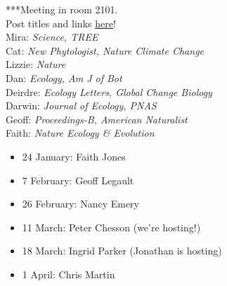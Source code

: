 \documentclass[11pt]{article}
\newenvironment{smitemize}{
\begin{itemize}
  \setlength{\itemsep}{0pt}
  \setlength{\parskip}{0.8pt}
  \setlength{\parsep}{0pt}}
{\end{itemize}
}
\begin{document}
***Meeting in room 2101.
\vspace{7pt}\\
 Post titles and links \href{https://docs.google.com/document/d/1j0WdDbjdp8ERLSO7whvtnP-tOblYMlX33TSCXy_uRKo/edit?usp=sharing}{\underline{here}}!\\
Mira: \emph{Science, TREE} \\
Cat: \emph{New Phytologist, Nature Climate Change}\\
Lizzie: \emph{Nature}\\
Dan: \emph{Ecology, Am J of Bot }\\
Deirdre: \emph{Ecology Letters, Global Change Biology}\\
Darwin: \emph{Journal of Ecology, PNAS}\\
Geoff: \emph{Proceedings-B, American Naturalist} \\
Faith: \emph{Nature Ecology \& Evolution}\\

\vspace{-1ex}
\begin{smitemize}
\item 24 January: Faith Jones
\item 7 February: Geoff Legault
\item 26 February: Nancy Emery
\item 11 March: Peter Chesson (we're hosting!)
\item 18 March: Ingrid Parker (Jonathan is hosting)
\item 1 April: Chris Martin
\end{smitemize}
\end{document}
